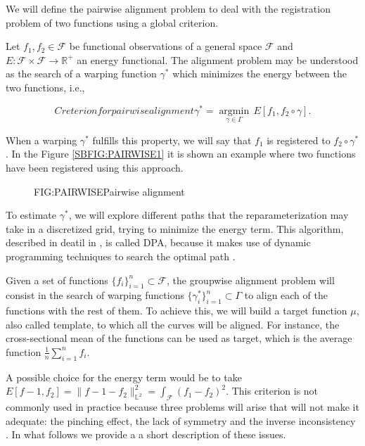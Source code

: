 
We will define the pairwise alignment problem \cite{Srivastava2016} to deal with
the registration problem of two functions using a global criterion.

Let $f_1, f_2 \in \mathcal{F}$ be functional observations of a general space
$\mathcal{F}$ and $E: \mathcal{F} \times \mathcal{F} \rightarrow \mathbb{R}^+$ an energy
functional. The alignment problem may be understood as the search of a warping
function $\gamma^*$ which minimizes the energy between the two functions, i.e.,

\begin{equation}[EQ:ENERGY]{Creterion for pairwise alignment}
\gamma^* = \underset{\gamma \in \Gamma}{ \operatorname{argmin}} \, E[f_1, f_2 \circ \gamma].
\end{equation}

When a warping $\gamma^*$ fulfills this property, we will say that $f_1$ is
registered to $f_2 \circ \gamma^*$. In the Figure \ref{SBFIG:PAIRWISE1} it is
shown an example where two functions have been registered using this approach.

\begin{figure}[Pairwise alignment]{FIG:PAIRWISE}{Pairwise alignment}
	 \quad
\end{figure}

To estimate $\gamma^*$, we will explore different paths that the
reparameterization may take in a discretized grid, trying to minimize the energy
term. This algorithm, described in deatil in \cite{Srivastava2016}, is called \ac{DPA},
because it makes use of dynamic programming techniques to search the optimal
path \cite{dpa}.

Given a set of functions $\{f_i\}_{i=1}^n \subset \mathcal{F}$, the
groupwise alignment problem will consist in the search of warping functions
$\{\gamma_i^* \}_{i=1}^n \subset \Gamma$ to align each of the functions with the
rest of them. To achieve this, we will build a target function $\mu$, also
called template, to which all the curves will be aligned. For instance,
the cross-sectional mean of the functions can be used as target, which is
the average function $\frac{1}{n}\sum_{i=1}^{n}f_i$.

A possible choice for the energy term would be to take
$E[f-1,f_2]= \|f-1 - f_2\|_{\mathbb{L}^2}^2=\int_\mathcal{F} (f_1 - f_2)^2$.
This criterion is not commonly used in practice because three
problems will arise that will not make it adequate: the pinching effect, the
lack of symmetry and the inverse inconsistency \cite{Marron2015}.
In what follows we provide a a short description of these issues.
